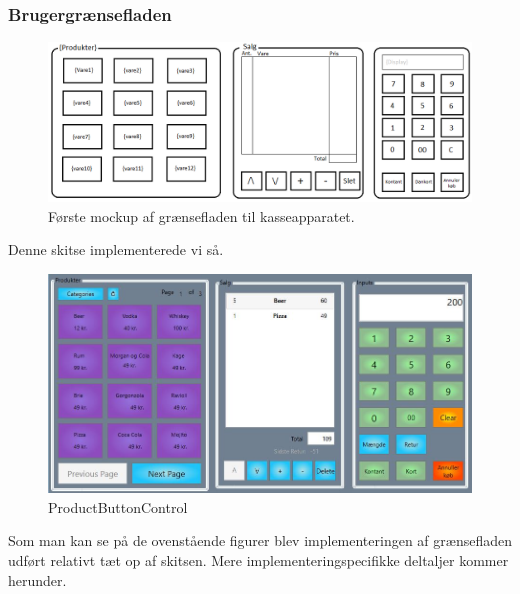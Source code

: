 \subsubsection{Brugergrænsefladen}

\begin{figure}[H]
	\centering
	\includegraphics[width=1\textwidth]{Systemdesign/Frontend/pics/KasseMockup}
	\caption{Første mockup af grænsefladen til kasseapparatet.}
	\label{fig:KasseMockup}
\end{figure}

Denne skitse implementerede vi så.

\begin{figure}[H]
	\centering
	\includegraphics[width=1\textwidth]{Systemdesign/Frontend/pics/GUI}
	\caption{ProductButtonControl}
	\label{fig:EndeligeGUI}
\end{figure}

Som man kan se på de ovenstående figurer blev implementeringen af grænsefladen udført relativt tæt op af skitsen. Mere implementeringspecifikke deltaljer kommer herunder.



